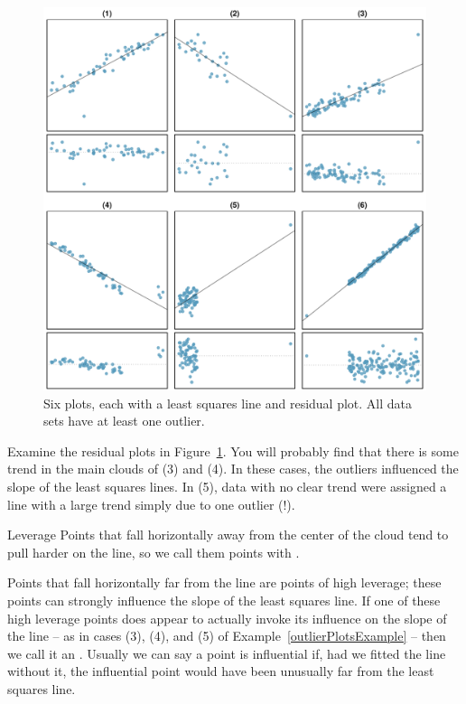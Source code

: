 \begin{figure}
\centering
\includegraphics[width=\textwidth]{ch_regr_simple_linear/figures/outlierPlots/outlierPlots}
\caption{Six plots, each with a least squares line and residual plot. All data sets have at least one outlier.}
\label{outlierPlots}
\end{figure}


Examine the residual plots in Figure~\ref{outlierPlots}. You will probably find that there is some trend in the main clouds of (3) and (4). In these cases, the outliers influenced the slope of the least squares lines. In (5), data with no clear trend were assigned a line with a large trend simply due to one outlier (!).
 
 \begin{onebox}{Leverage}
Points that fall horizontally away from the center of the cloud tend to pull harder on the line, so we call them points with .\end{onebox}

Points that fall horizontally far from the line are points of high leverage; these points can strongly influence the slope of the least squares line. If one of these high leverage points does appear to actually invoke its influence on the slope of the line -- as in cases (3), (4), and (5) of Example~\ref{outlierPlotsExample} -- then we call it an . Usually we can say a point is influential if, had we fitted the line without it, the influential point would have been unusually far from the least squares line.

